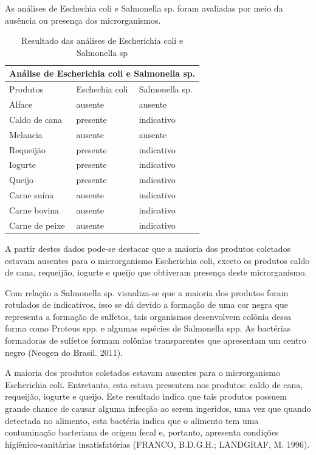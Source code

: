 \documentclass[article,12pt,onesidea,4paper,english,brazil]{abntex2}
\begin{document}
As análises de Eschechia coli e Salmonella sp. foram avaliadas por meio da ausência ou presença dos microrganismos.

\begin{table}[h]
	\centering
	\caption{Resultado das análises de Escherichia coli e Salmonella sp}
	\label{my-label}
	\begin{tabular}{p{.3\linewidth}p{.3\linewidth}p{.3\linewidth}}
		\hline
		\multicolumn{3}{c}{Análise de Escherichia coli e Salmonella sp.} \\
		\hline
		Produtos             & Eschechia coli      & Salmonella sp.      \\
		Alface               & ausente             & ausente             \\
		Caldo de cana        & presente            & indicativo          \\
		Melancia             & ausente             & ausente             \\
		Requeijão            & presente            & indicativo          \\
		Iogurte              & presente            & indicativo          \\
		Queijo               & presente            & indicativo          \\
		Carne suína          & ausente             & indicativo          \\
		Carne bovina         & ausente             & indicativo          \\
		Carne de peixe       & ausente             & indicativo         \\ \hline
	\end{tabular}
\end{table}

A partir destes dados pode-se destacar que a maioria dos produtos coletados estavam ausentes para o microrganismo Escherichia coli, exceto os produtos caldo de cana, requeijão, iogurte e queijo que obtiveram presença deste microrganismo.

Com relação a Salmonella sp. visualiza-se que a maioria dos produtos foram rotulados de indicativos, isso se dá devido a formação de uma cor negra que representa a formação de sulfetos, tais organismos desenvolvem colônia dessa forma como Proteus spp. e algumas espécies de Salmonella spp. As bactérias formadoras de sulfetos formam colônias transparentes que apresentam um centro negro (Neogen do Brasil. 2011).

A maioria dos produtos coletados estavam ausentes para o microrganismo Escherichia coli. Entretanto, esta estava presentem nos produtos: caldo de cana, requeijão, iogurte e queijo. Este resultado indica que tais produtos possuem grande chance de causar alguma infecção ao serem ingeridos, uma vez que quando detectada no alimento, esta bactéria indica que o alimento tem uma contaminação
bacteriana de origem fecal e, portanto, apresenta condições higiênico-sanitárias insatisfatórias (FRANCO, B.D.G.H.; LANDGRAF, M. 1996).
	
\end{document}
